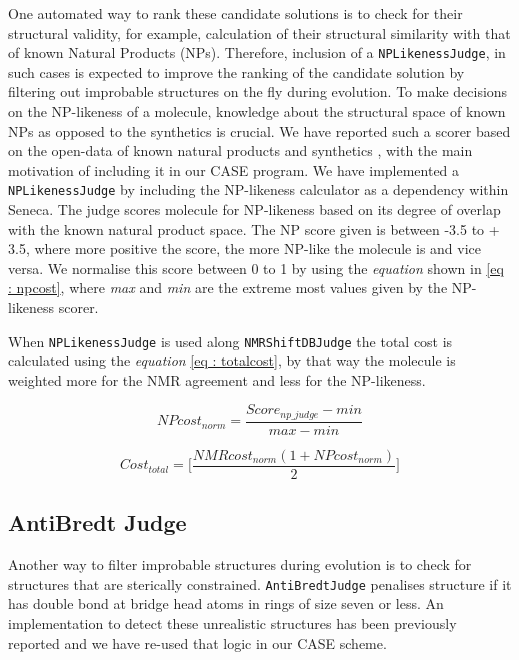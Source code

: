 \documentclass[10pt]{bmc_article}
\newenvironment{bmcformat}{\begin{raggedright}\baselineskip20pt\sloppy\setboolean{publ}{false}}{\end{raggedright}\baselineskip20pt\sloppy}
\begin{document}
\begin{bmcformat}
One automated way to rank these candidate solutions is to check for their structural validity, for example, calculation of their structural similarity with that of known Natural Products (NPs).  Therefore, inclusion of a \texttt{NPLikenessJudge}, in such cases is expected to improve the ranking of the candidate solution by filtering out improbable structures on the fly during evolution. To make decisions on the NP-likeness of a molecule, knowledge about the structural space of known NPs as opposed to the synthetics is crucial. We have reported such a scorer based on the open-data of known natural products and synthetics \cite{Jayaseelan}, with the main motivation of including it in our CASE program. We have implemented a  \texttt{NPLikenessJudge} by including the NP-likeness calculator as a dependency within Seneca. The judge scores molecule for NP-likeness based on its degree of overlap with the known natural product space.
The NP score given is between -3.5 to + 3.5, where more positive the score, the more NP-like the molecule is and vice versa. We normalise this score between 0 to 1 by using the  \emph{equation} shown in \ref{eq : npcost}, where \emph{max} and \emph{min} are the extreme most values given by the NP-likeness scorer.


When \texttt{NPLikenessJudge} is used along \texttt{NMRShiftDBJudge} the total cost is calculated using the  \emph{equation} \ref{eq : totalcost}, by that way the molecule is weighted more for the NMR agreement and less for the NP-likeness. 

 \begin{equation}
NPcost_{norm} = \frac{Score_{np\_judge} - min} {max -min}
\label{eq : npcost}  
\end{equation}

 
 \begin{equation}
Cost_{total} = \Bigg[\frac{NMRcost_{norm}(1+NPcost_{norm})}{2}\Bigg]
\label{eq : totalcost}  
\end{equation}

 \subsection*{AntiBredt Judge}
 
 Another way to filter improbable structures during evolution is to check for structures that are sterically constrained. \texttt{AntiBredtJudge} penalises structure if it has double bond at bridge head atoms in rings of size seven or less. An implementation to detect these unrealistic structures has been previously reported \cite{Nuzillard} and we have re-used that logic in our CASE scheme. 
  


\end{bmcformat}
\end{document}
